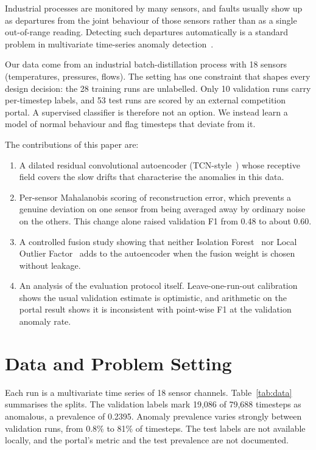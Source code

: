 \documentclass[runningheads]{llncs}
\begin{document}
Industrial processes are monitored by many sensors, and faults usually show up as departures from the joint behaviour of those sensors rather than as a single out-of-range reading. Detecting such departures automatically is a standard problem in multivariate time-series anomaly detection~\cite{malhotra2016lstm,hundman2018detecting,audibert2020usad}.

Our data come from an industrial batch-distillation process with 18 sensors (temperatures, pressures, flows). The setting has one constraint that shapes every design decision: the 28 training runs are unlabelled. Only 10 validation runs carry per-timestep labels, and 53 test runs are scored by an external competition portal. A supervised classifier is therefore not an option. We instead learn a model of normal behaviour and flag timesteps that deviate from it.

The contributions of this paper are:
\begin{enumerate}
  \item A dilated residual convolutional autoencoder (TCN-style~\cite{bai2018empirical,oord2016wavenet}) whose receptive field covers the slow drifts that characterise the anomalies in this data.
  \item Per-sensor Mahalanobis scoring of reconstruction error, which prevents a genuine deviation on one sensor from being averaged away by ordinary noise on the others. This change alone raised validation F1 from 0.48 to about 0.60.
  \item A controlled fusion study showing that neither Isolation Forest~\cite{liu2008isolation} nor Local Outlier Factor~\cite{breunig2000lof} adds to the autoencoder when the fusion weight is chosen without leakage.
  \item An analysis of the evaluation protocol itself. Leave-one-run-out calibration shows the usual validation estimate is optimistic, and arithmetic on the portal result shows it is inconsistent with point-wise F1 at the validation anomaly rate.
\end{enumerate}

\section{Data and Problem Setting}

Each run is a multivariate time series of 18 sensor channels. Table~\ref{tab:data} summarises the splits. The validation labels mark 19{,}086 of 79{,}688 timesteps as anomalous, a prevalence of 0.2395. Anomaly prevalence varies strongly between validation runs, from 0.8\% to 81\% of timesteps. The test labels are not available locally, and the portal's metric and the test prevalence are not documented.
\end{document}
